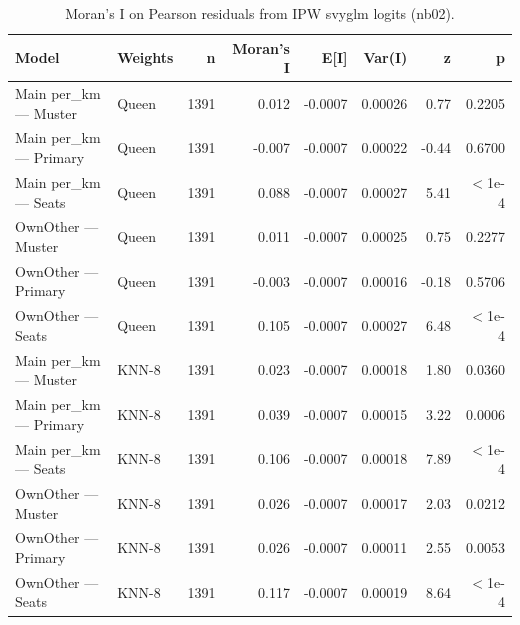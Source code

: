 \begin{table}[H]
\centering
\caption{Moran's I on Pearson residuals from IPW svyglm logits (nb02).} 
\label{tab:moran_nb02}
\begin{tabular}{llrrrrrr}
  \hline
Model & Weights & n & Moran's I & E[I] & Var(I) & z & p \\ 
  \hline
Main per\_km — Muster & Queen & 1391 & 0.012 & -0.0007 & 0.00026 & 0.77 & 0.2205 \\ 
  Main per\_km — Primary & Queen & 1391 & -0.007 & -0.0007 & 0.00022 & -0.44 & 0.6700 \\ 
  Main per\_km — Seats & Queen & 1391 & 0.088 & -0.0007 & 0.00027 & 5.41 & $<$1e-4 \\ 
  OwnOther — Muster & Queen & 1391 & 0.011 & -0.0007 & 0.00025 & 0.75 & 0.2277 \\ 
  OwnOther — Primary & Queen & 1391 & -0.003 & -0.0007 & 0.00016 & -0.18 & 0.5706 \\ 
  OwnOther — Seats & Queen & 1391 & 0.105 & -0.0007 & 0.00027 & 6.48 & $<$1e-4 \\ 
  Main per\_km — Muster & KNN-8 & 1391 & 0.023 & -0.0007 & 0.00018 & 1.80 & 0.0360 \\ 
  Main per\_km — Primary & KNN-8 & 1391 & 0.039 & -0.0007 & 0.00015 & 3.22 & 0.0006 \\ 
  Main per\_km — Seats & KNN-8 & 1391 & 0.106 & -0.0007 & 0.00018 & 7.89 & $<$1e-4 \\ 
  OwnOther — Muster & KNN-8 & 1391 & 0.026 & -0.0007 & 0.00017 & 2.03 & 0.0212 \\ 
  OwnOther — Primary & KNN-8 & 1391 & 0.026 & -0.0007 & 0.00011 & 2.55 & 0.0053 \\ 
  OwnOther — Seats & KNN-8 & 1391 & 0.117 & -0.0007 & 0.00019 & 8.64 & $<$1e-4 \\ 
   \hline
\end{tabular}
\end{table}
